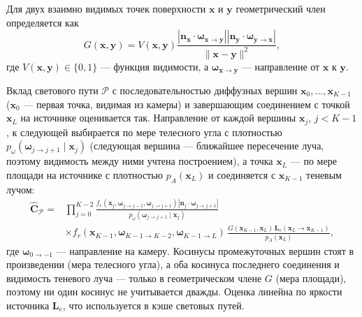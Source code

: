 Для двух взаимно видимых точек поверхности $\mathbf{x}$ и $\mathbf{y}$ геометрический член определяется как
\begin{equation}
G(\mathbf{x},\mathbf{y})
=
V(\mathbf{x},\mathbf{y})
\frac{
\left|\mathbf{n}_{\mathbf{x}}\cdot\boldsymbol{\omega}_{\mathbf{x}\rightarrow\mathbf{y}}\right|
\left|\mathbf{n}_{\mathbf{y}}\cdot\boldsymbol{\omega}_{\mathbf{y}\rightarrow\mathbf{x}}\right|
}{
\|\mathbf{x}-\mathbf{y}\|^2
},
\end{equation}
где $V(\mathbf{x},\mathbf{y})\in\{0,1\}$ --- функция видимости, а $\boldsymbol{\omega}_{\mathbf{x}\rightarrow\mathbf{y}}$ --- направление от $\mathbf{x}$ к $\mathbf{y}$.

Вклад светового пути $\mathcal{P}$ с последовательностью диффузных вершин $\mathbf{x}_0,\ldots,\mathbf{x}_{K-1}$ ($\mathbf{x}_0$ --- первая точка, видимая из камеры) и завершающим соединением с точкой $\mathbf{x}_L$ на источнике оценивается так. Направление от каждой вершины $\mathbf{x}_j$, $j<K-1$, к следующей выбирается по мере телесного угла с плотностью $p_\omega(\boldsymbol{\omega}_{j\rightarrow j+1}\mid\mathbf{x}_j)$ (следующая вершина --- ближайшее пересечение луча, поэтому видимость между ними учтена построением), а точка $\mathbf{x}_L$ --- по мере площади на источнике с плотностью $p_A(\mathbf{x}_L)$ и соединяется с $\mathbf{x}_{K-1}$ теневым лучом:
\begin{equation}
\begin{aligned}
\widehat{\mathbf{C}}_{\mathcal{P}}
={}&
\prod_{j=0}^{K-2}
\frac{
 f_r(\mathbf{x}_j,\boldsymbol{\omega}_{j\rightarrow j-1},\boldsymbol{\omega}_{j\rightarrow j+1})
 \left|\mathbf{n}_j\cdot\boldsymbol{\omega}_{j\rightarrow j+1}\right|
}{p_\omega(\boldsymbol{\omega}_{j\rightarrow j+1}\mid\mathbf{x}_j)}
\\
&\times
f_r(\mathbf{x}_{K-1},\boldsymbol{\omega}_{K-1\rightarrow K-2},\boldsymbol{\omega}_{K-1\rightarrow L})
\,
\frac{G(\mathbf{x}_{K-1},\mathbf{x}_L)\,\mathbf{L}_{e}(\mathbf{x}_L\rightarrow\mathbf{x}_{K-1})}{p_A(\mathbf{x}_L)},
\end{aligned}
\end{equation}
где $\boldsymbol{\omega}_{0\rightarrow -1}$ --- направление на камеру. Косинусы промежуточных вершин стоят в произведении (мера телесного угла), а оба косинуса последнего соединения и видимость теневого луча --- только в геометрическом члене $G$ (мера площади), поэтому ни один косинус не учитывается дважды. Оценка линейна по яркости источника $\mathbf{L}_e$, что используется в кэше световых путей.

